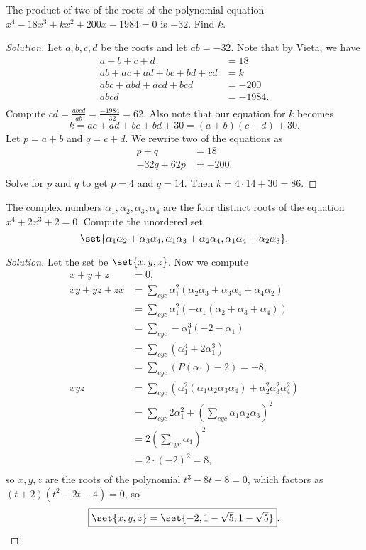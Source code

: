 \begin{prb}[USAMO 1984-1]
The product of two of the roots of the polynomial equation $x^4 - 18x^3 + kx^2 +
200x - 1984 = 0$ is $-32$. Find $k$.
\end{prb}

\ifsolutions
\begin{proof}[Solution]
Let $a, b, c, d$ be the roots and let $ab = -32$. Note that by Vieta, we have
\[ \begin{aligned}
a + b + c + d &= 18 \\
ab + ac + ad + bc + bd + cd &= k \\
abc + abd + acd + bcd &= -200 \\
abcd &= -1984. \\
\end{aligned} \]
Compute $cd = \frac{abcd}{ab} = \frac{-1984}{-32} = 62$. Also note that our
equation for $k$ becomes
\[ k = ac + ad + bc + bd + 30 = (a + b)(c + d) + 30. \]
Let $p = a + b$ and $q = c + d$. We rewrite two of the equations as
\[ \begin{aligned}
p + q &= 18 \\
-32q + 62p &= -200. \\
\end{aligned} \]
Solve for $p$ and $q$ to get $p = 4$ and $q = 14$. Then $k = 4 \cdot 14 + 30 =
\boxed{86}$.
\end{proof}
\fi

\begin{prb}[HMMT 2007 A-9]
The complex numbers $\alpha_1, \alpha_2, \alpha_3, \alpha_4$ are the four
distinct roots of the equation $x^4 + 2x^3 + 2 = 0$. Compute the unordered set
\[ \set{\alpha_1 \alpha_2 + \alpha_3 \alpha_4, \alpha_1 \alpha_3 + \alpha_2
\alpha_4, \alpha_1 \alpha_4 + \alpha_2 \alpha_3}. \]
\end{prb}

\ifsolutions
\begin{proof}[Solution]
Let the set be $\set{x, y, z}$. Now we compute
\[ \begin{aligned}
x + y + z &= 0, \\
xy + yz + zx &= \sum_{cyc} \alpha_1^2 (\alpha_2 \alpha_3 + \alpha_3 \alpha_4 +
\alpha_4 \alpha_2) \\
&= \sum_{cyc} \alpha_1^2 (-\alpha_1 (\alpha_2 + \alpha_3 + \alpha_4)) \\
&= \sum_{cyc} -\alpha_1^3 (-2 - \alpha_1) \\
&= \sum_{cyc} (\alpha_1^4 + 2 \alpha_1^3) \\
&= \sum_{cyc} (P(\alpha_1) - 2) = -8, \\
xyz &= \sum_{cyc} (\alpha_1^2 (\alpha_1 \alpha_2 \alpha_3 \alpha_4) + \alpha_2^2
\alpha_3^2 \alpha_4^2) \\
&= \sum_{cyc} 2\alpha_1^2 + \left(\sum_{cyc} \alpha_1 \alpha_2 \alpha_3
\right)^2 \\
&= 2 \left( \sum_{cyc} \alpha_1 \right)^2 \\
&= 2 \cdot (-2)^2 = 8, \\
\end{aligned} \]
so $x, y, z$ are the roots of the polynomial $t^3 - 8t - 8 = 0$, which factors
as $(t + 2)(t^2 - 2t - 4) = 0$, so
\[ \boxed{\set{x, y, z} = \set{-2, 1 - \sqrt{5}, 1 - \sqrt{5}}}. \]
\end{proof}
\fi
